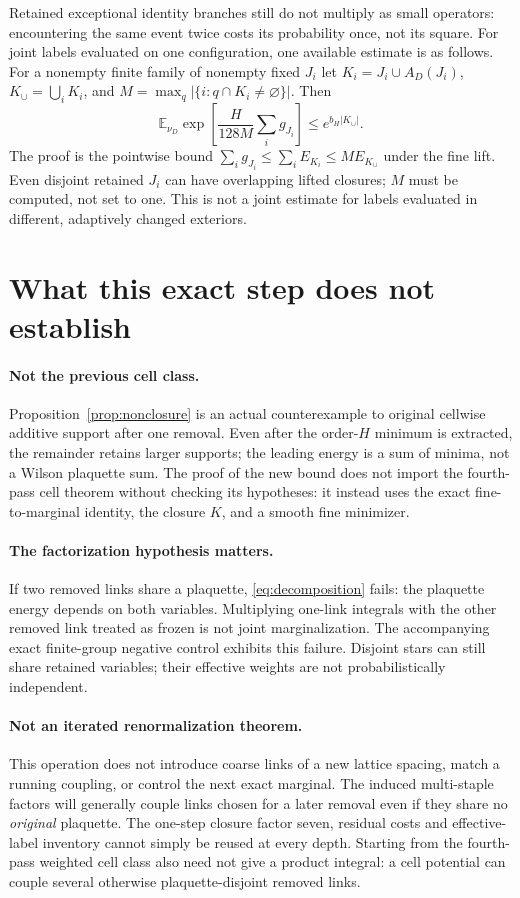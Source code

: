 \documentclass[11pt]{article}
\theoremstyle{definition}
\theoremstyle{remark}
\newcommand{\E}{\mathbb E}
\begin{document}
Retained exceptional identity branches still do not multiply as small
operators: encountering the same event twice costs its probability once,
not its square. For joint labels evaluated on one configuration, one
available estimate is as follows. For a nonempty finite family of nonempty
fixed $J_i$ let
$K_i=J_i\cup A_D(J_i)$, $K_\cup=\bigcup_iK_i$, and
$M=\max_q|\{i:q\cap K_i\ne\varnothing\}|$. Then
\begin{equation}
 \E_{\nu_D}\exp\left[\frac H{128M}\sum_i g_{J_i}\right]
 \le e^{b_H|K_\cup|}.
 \label{eq:joint}
\end{equation}
The proof is the pointwise bound
$\sum_i g_{J_i}\le\sum_i E_{K_i}\le M E_{K_\cup}$ under the fine lift.
Even disjoint retained $J_i$ can have overlapping lifted closures; $M$
must be computed, not set to one. This is not a joint estimate for
labels evaluated in different, adaptively changed exteriors.

\section{What this exact step does not establish}
\paragraph{Not the previous cell class.}
Proposition~\ref{prop:nonclosure} is an actual counterexample to original
cellwise additive support after one removal. Even after the order-$H$
minimum is extracted, the remainder retains larger supports; the leading
energy is a sum of minima, not a Wilson plaquette sum. The proof of the
new bound does not import the fourth-pass cell theorem without checking
its hypotheses: it instead uses the exact fine-to-marginal identity,
the closure $K$, and a smooth fine minimizer.

\paragraph{The factorization hypothesis matters.}
If two removed links share a plaquette, \eqref{eq:decomposition} fails:
the plaquette energy depends on both variables. Multiplying one-link
integrals with the other removed link treated as frozen is not joint
marginalization. The accompanying exact finite-group negative control
exhibits this failure. Disjoint stars can still share retained variables;
their effective weights are not probabilistically independent.

\paragraph{Not an iterated renormalization theorem.}
This operation does not introduce coarse links of a new lattice spacing,
match a running coupling, or control the next exact marginal. The induced
multi-staple factors will generally couple links chosen for a later
removal even if they share no \emph{original} plaquette. The one-step
closure factor seven, residual costs and effective-label inventory cannot
simply be reused at every depth. Starting from the fourth-pass weighted
cell class also need not give a product integral: a cell potential can
couple several otherwise plaquette-disjoint removed links.
\end{document}
